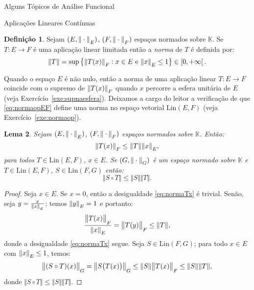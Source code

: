 \documentclass[oneside,final,11pt]{amsbook}
\newcommand{\K}{\mathds K}
\newcommand{\Lin}{\mathrm{Lin}}
\newcommand{\norma}[2]{\Vert#1\Vert_{\lower2pt\hbox{$\scriptstyle#2$}}}
\newcommand{\bignorma}[2]{\big\Vert#1\big\Vert_{\lower2pt\hbox{$\scriptstyle#2$}}}
\newcommand{\subnorma}[2]{\Vert#1\Vert_{\lower2pt\hbox{$\scriptscriptstyle#2$}}}
\theoremstyle{remark}\newtheorem{exercise}{Exercício}[chapter]
\theoremstyle{remark}\newtheorem{*exercise}[exercise]{\hbox to 0pt{\hskip 0pt minus 1fil*}Exercício}
\theoremstyle{definition}\newtheorem{exdefin}{Definição}[chapter]
\theoremstyle{plain}\newtheorem{teo}{Teorema}[section]
\theoremstyle{plain}\newtheorem{lem}[teo]{Lema}
\theoremstyle{plain}\newtheorem{prop}[teo]{Proposição}
\theoremstyle{plain}\newtheorem{cor}[teo]{Corolário}
\theoremstyle{definition}\newtheorem{defin}[teo]{Definição}
\theoremstyle{remark}\newtheorem{rem}[teo]{Observação}
\theoremstyle{definition}\newtheorem{notation}[teo]{Notação}
\theoremstyle{definition}\newtheorem{convention}[teo]{Convenção}
\theoremstyle{definition}\newtheorem{example}[teo]{Exemplo}
\numberwithin{section}{chapter}
\numberwithin{equation}{section}
\begin{document}
\begin{chapter}{Alguns Tópicos de Análise Funcional}
\begin{section}{Aplicações Lineares Contínuas}
\begin{defin}\label{thm:normaapllinear}
Sejam $(E,\norma\cdot E)$, $(F,\norma\cdot F)$ espaços normados sobre $\K$.
Se $T:E\to F$ é uma aplicação linear limitada então a
{\em norma\/}%
de $T$ é definida por:
\begin{equation}\label{eq:normaopEF}
\Vert T\Vert=\sup\big\{\norma{T(x)}F:\text{$x\in E$ e $\norma xE\le1$}\big\}\in\left[0,+\infty\right[.
\end{equation}
\end{defin}
Quando o espaço $E$ é não nulo, então a norma de uma aplicação linear $T:E\to F$ coincide
com o supremo de $\norma{T(x)}F$ quando $x$ percorre a esfera unitária de $E$ (veja
Exercício~\ref{exe:supnaesfera}). Deixamos a cargo do leitor a verificação de que
\eqref{eq:normaopEF} define uma norma no espaço vetorial $\Lin(E,F)$ (veja Exercício~\ref{exe:normaop}).

\begin{lem}\label{thm:normacomposta}
Sejam $(E,\norma\cdot E)$, $(F,\norma\cdot F)$ espaços normados sobre $\K$.
Então:
\begin{equation}\label{eq:normaTx}
\norma{T(x)}F\le\Vert T\Vert\norma xE,
\end{equation}
para todos $T\in\Lin(E,F)$, $x\in E$. Se $(G,\norma\cdot G)$ é um espaço normado sobre $\K$
e $T\in\Lin(E,F)$, $S\in\Lin(F,G)$ então:
\[\Vert S\circ T\Vert\le\Vert S\Vert\Vert T\Vert.\]
\end{lem}
\begin{proof}
Seja $x\in E$. Se $x=0$, então a desigualdade \eqref{eq:normaTx} é trivial.
Senão, seja $y=\frac x{\subnorma xE}$; temos $\norma yE=1$ e portanto:
\[\frac{\bignorma{T(x)}F}{\norma xE}=\bignorma{T(y)}F\le\Vert T\Vert,\]
donde a desigualdade \eqref{eq:normaTx} segue.
Seja $S\in\Lin(F,G)$; para todo $x\in E$ com $\norma xE\le1$, temos:
\[\bignorma{(S\circ T)(x)}G=\bignorma{S\big(T(x)\big)}G\le
\Vert S\Vert\bignorma{T(x)}F\le\Vert S\Vert\Vert T\Vert,\]
donde $\Vert S\circ T\Vert\le\Vert S\Vert\Vert T\Vert$.
\end{proof}


\end{section}
\end{chapter}
\end{document}
